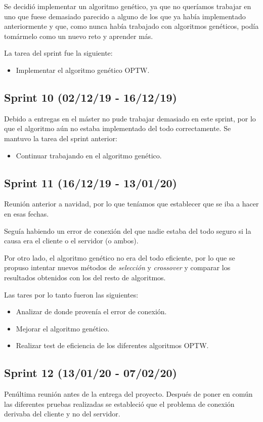 Se decidió implementar un algoritmo genético, ya que no queríamos trabajar en uno que fuese demasiado parecido a alguno de los que ya había implementado anteriormente y que, como nunca había trabajado con algoritmos genéticos, podía tomármelo como un nuevo reto y aprender más.

La tarea del sprint fue la siguiente:

\begin{itemize}
\item Implementar el algoritmo genético OPTW.
\end{itemize}
\subsection{Sprint 10 (02/12/19 - 16/12/19)}
Debido a entregas en el máster no pude trabajar demasiado en este sprint, por lo que el algoritmo aún no estaba implementado del todo correctamente.
Se mantuvo la tarea del sprint anterior:
\begin{itemize}
\item Continuar trabajando en el algoritmo genético.
\end{itemize}
\subsection{Sprint 11 (16/12/19 - 13/01/20)}
Reunión anterior a navidad, por lo que teníamos que establecer que se iba a hacer en esas fechas.

Seguía habiendo un error de conexión del que nadie estaba del todo seguro si la causa era el cliente o el servidor (o ambos).

Por otro lado, el algoritmo genético no era del todo eficiente, por lo que se propuso intentar nuevos métodos de \textit{selección} y \textit{crossover} y comparar los resultados obtenidos con los del resto de algoritmos.

Las tares por lo tanto fueron las siguientes:
\begin{itemize}
\item Analizar de donde provenía el error de conexión.
\item Mejorar el algoritmo genético.
\item Realizar test de eficiencia de los diferentes algoritmos OPTW.
\end{itemize}
\subsection{Sprint 12 (13/01/20 - 07/02/20)}
Penúltima reunión antes de la entrega del proyecto. 
Después de poner en común las diferentes pruebas realizadas se estableció que el problema de conexión derivaba del cliente y no del servidor.

